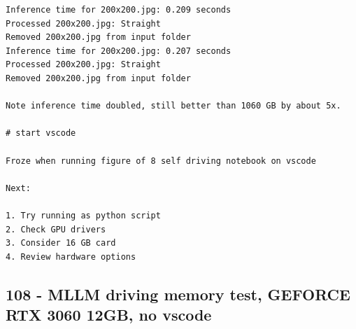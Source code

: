 \begin{verbatim}
Inference time for 200x200.jpg: 0.209 seconds
Processed 200x200.jpg: Straight
Removed 200x200.jpg from input folder
Inference time for 200x200.jpg: 0.207 seconds
Processed 200x200.jpg: Straight
Removed 200x200.jpg from input folder

Note inference time doubled, still better than 1060 GB by about 5x.

# start vscode

Froze when running figure of 8 self driving notebook on vscode

Next:

1. Try running as python script
2. Check GPU drivers
3. Consider 16 GB card
4. Review hardware options
\end{verbatim}

\subsection{108 - MLLM driving memory test, GEFORCE RTX 3060 12GB, no vscode}
\label{app_res:108}

